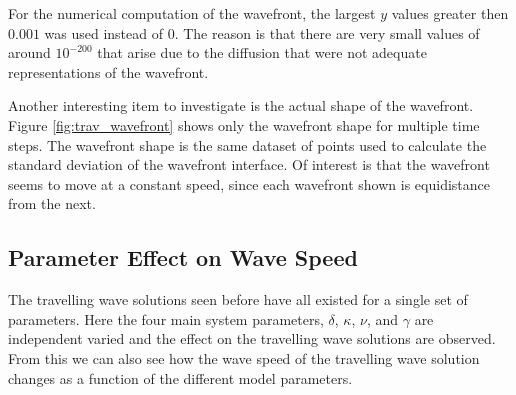 For the numerical computation of the wavefront, the largest $y$ values greater then $0.001$ was used instead of $0$.
The reason is that there are very small values of around $10^{-200}$ that arise due to the diffusion that were not adequate representations of the wavefront.

Another interesting item to investigate is the actual shape of the wavefront.
Figure \ref{fig:trav_wavefront} shows only the wavefront shape for multiple time steps.
The wavefront shape is the same dataset of points used to calculate the standard deviation of the wavefront interface.
Of interest is that the wavefront seems to move at a constant speed, since each wavefront shown is equidistance from the next.





\subsection{Parameter Effect on Wave Speed}

The travelling wave solutions seen before have all existed for a single set of parameters.
Here the four main system parameters, $\delta$, $\kappa$, $\nu$, and $\gamma$ are independent varied and the effect on the travelling wave solutions are observed.
From this we can also see how the wave speed of the travelling wave solution changes as a function of the different model parameters.

